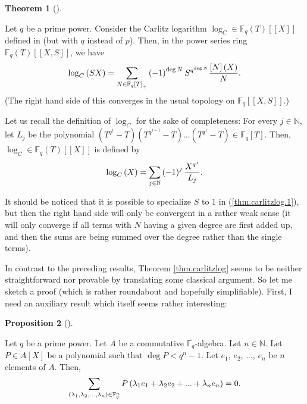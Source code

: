 \documentclass[numbers=enddot,12pt,final,onecolumn,notitlepage]{scrartcl}%
\theoremstyle{definition}
\newtheorem{theo}{Theorem}[section]
\newenvironment{theorem}[1][]
{\begin{theo}[#1]\begin{leftbar}}
{\end{leftbar}\end{theo}}
\newtheorem{prop}[theo]{Proposition}
\newenvironment{proposition}[1][]
{\begin{prop}[#1]\begin{leftbar}}
{\end{leftbar}\end{prop}}
\let\sumnonlimits\sum
\renewcommand{\sum}{\sumnonlimits\limits}
\begin{document}
\begin{theorem}
\label{thm.carlitzlog}Let $q$ be a prime power. Consider the Carlitz logarithm
$\log_{C}\in\mathbb{F}_{q}\left(  T\right)  \left[  \left[  X\right]  \right]
$ defined in \cite[Section 7]{kc-carlitz} (but with $q$ instead of $p$). Then,
in the power series ring $\mathbb{F}_{q}\left(  T\right)  \left[  \left[
X,S\right]  \right]  $, we have%
\begin{equation}
\log_{C}\left(  SX\right)  =\sum\limits_{N\in\mathbb{F}_{q}\left[  T\right]
_{+}}\left(  -1\right)  ^{\deg N}S^{q^{\deg N}}\dfrac{\left[  N\right]
\left(  X\right)  }{N}. \label{thm.carlitzlog.1}%
\end{equation}
(The right hand side of this converges in the usual topology on $\mathbb{F}%
_{q}\left[  \left[  X,S\right]  \right]  $.)
\end{theorem}

Let us recall the definition of $\log_{C}$ for the sake of completeness: For
every $j\in\mathbb{N}$, let $L_{j}$ be the polynomial $\left(  T^{q^{j}%
}-T\right)  \left(  T^{q^{j-1}}-T\right)  ...\left(  T^{q^{1}}-T\right)
\in\mathbb{F}_{q}\left[  T\right]  $. Then, $\log_{C}\in\mathbb{F}_{q}\left(
T\right)  \left[  \left[  X\right]  \right]  $ is defined by%
\begin{equation}
\log_{C}\left(  X\right)  =\sum\limits_{j\in\mathbb{N}}\left(  -1\right)
^{j}\dfrac{X^{q^{j}}}{L_{j}}. \label{carlitzlog}%
\end{equation}


It should be noticed that it is possible to specialize $S$ to $1$ in
(\ref{thm.carlitzlog.1}), but then the right hand side will only be convergent
in a rather weak sense (it will only converge if all terms with $N$ having a
given degree are first added up, and then the sums are being summed over the
degree rather than the single terms).

In contrast to the preceding results, Theorem \ref{thm.carlitzlog} seems to be
neither straightforward nor provable by translating some classical argument.
So let me sketch a proof (which is rather roundabout and hopefully
simplifiable). First, I need an auxiliary result which itself seems rather interesting:

\begin{proposition}
\label{prop.carlitzlog.lem}Let $q$ be a prime power. Let $A$ be a commutative
$\mathbb{F}_{q}$-algebra. Let $n\in\mathbb{N}$. Let $P\in A\left[  X\right]  $
be a polynomial such that $\deg P<q^{n}-1$. Let $e_{1}$, $e_{2}$, $...$,
$e_{n}$ be $n$ elements of $A$. Then,%
\[
\sum\limits_{\left(  \lambda_{1},\lambda_{2},...,\lambda_{n}\right)
\in\mathbb{F}_{q}^{n}}P\left(  \lambda_{1}e_{1}+\lambda_{2}e_{2}%
+...+\lambda_{n}e_{n}\right)  =0.
\]

\end{proposition}
\end{document}
